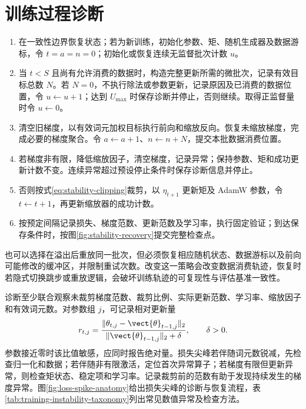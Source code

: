 \documentclass[../textbook.tex]{subfiles}
\begin{document}
\section{训练过程诊断}

\begin{algorithm}[具有明确跳步语义的训练更新]
\begin{enumerate}
\item 在一致性边界恢复状态；若为新训练，初始化参数、矩、随机生成器及数据游标，令 $t=a=n=0$；初始化或恢复连续无监督批次计数 $u$。
\item 当 $t<S$ 且尚有允许消费的数据时，构造完整更新所需的微批次，记录有效目标总数 $N$。若 $N=0$，不执行除法或参数更新，记录原因及已消费的数据位置，令 $u\leftarrow u+1$；达到 $U_{\max}$ 时保存诊断并停止，否则继续。取得正监督量时令 $u\leftarrow0$。
\item 清空旧梯度，以有效词元加权目标执行前向和缩放反向。恢复未缩放梯度，完成必要的梯度聚合。令 $a\leftarrow a+1$、$n\leftarrow n+N$，提交本批数据消费位置。
\item 若梯度非有限，降低缩放因子，清空梯度，记录异常；保持参数、矩和成功更新计数不变。连续异常超过预设停止条件时保存诊断信息并停止。
\item 否则按式\eqref{eq:stability-clipping}裁剪，以 $\eta_{t+1}$ 更新矩及 AdamW 参数，令 $t\leftarrow t+1$，再更新缩放器的成功计数。
\item 按预定间隔记录损失、梯度范数、更新范数及学习率，执行固定验证；到达保存条件时，按图\ref{fig:stability-recovery}提交完整检查点。
\end{enumerate}
\end{algorithm}

也可以选择在溢出后重放同一批次，但必须恢复相应随机状态、数据游标以及前向可能修改的缓冲区，并限制重试次数。改变这一策略会改变数据消费轨迹，恢复时若隐式切换跳步或重放逻辑，会破坏训练轨迹的可复现性与评估基准一致性。

诊断至少联合观察未裁剪梯度范数、裁剪比例、实际更新范数、学习率、缩放因子和有效词元数。对参数组 $j$，可记录相对更新量
\begin{equation}
 r_{t,j}=\frac{\|\theta_{t,j}-\vect{\theta}_{t-1,j}\|_2}
 {\|\vect{\theta}_{t-1,j}\|_2+\delta},\qquad\delta>0.
\end{equation}
参数接近零时该比值敏感，应同时报告绝对量。损失尖峰若伴随词元数锐减，先检查归一化和数据；若伴随非有限激活，定位首次异常算子；若梯度有限但更新异常，则检查矩状态、稳定项和学习率。记录裁剪前的范数有助于发现持续发生的梯度异常。图\ref{fig:loss-spike-anatomy}给出损失尖峰的诊断与恢复流程，表\ref{tab:training-instability-taxonomy}列出常见数值异常及检查方法。
\end{document}
